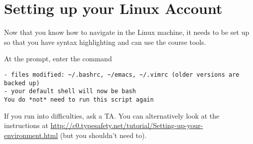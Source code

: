 \section*{Setting up your Linux Account}

Now that you know how to navigate in the Linux machine, it needs to be
set up so that you have syntax highlighting and can use the course tools.

\begin{part}
At the prompt, enter the command
\begin{lstlisting}[language={[coin]C},deletekeywords={do}]
% /afs/andrew/course/15/122/bin/15122-setup.sh
- files modified: ~/.bashrc, ~/emacs, ~/.vimrc (older versions are backed up)
- your default shell will now be bash
You do *not* need to run this script again
\end{lstlisting}
If you run into difficulties, ask a TA\@.  You can alternatively look
at the instructions at
\url{http://c0.typesafety.net/tutorial/Setting-up-your-environment.html}
(but you shouldn't need to).
\end{part}
